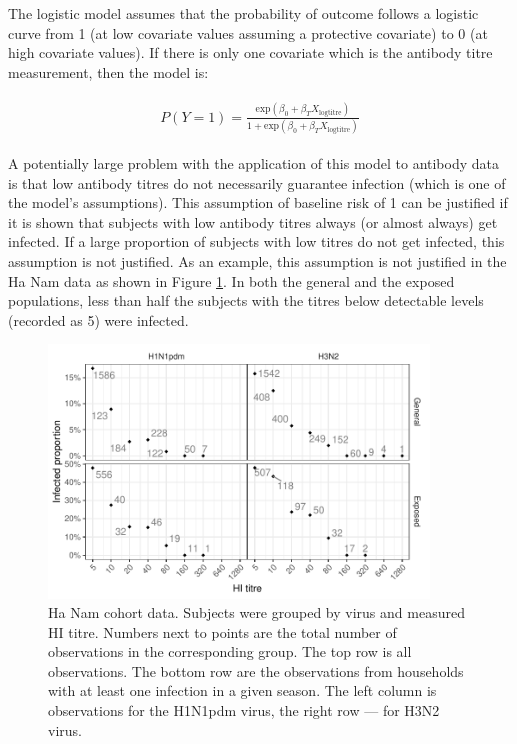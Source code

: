 \documentclass[12pt]{article}
\begin{document}
The logistic model assumes that the probability of outcome follows a logistic curve from 1 (at low covariate values assuming a protective covariate) to 0 (at high covariate values). If there is only one covariate which is the antibody titre measurement, then the model is:

\begin{align*}
\begin{gathered}
P(Y=1) = \frac{\text{exp}(\beta_0 + \beta_T X_{\text{logtitre}})}{1 + \text{exp}(\beta_0 + \beta_T X_{\text{logtitre}})}
\end{gathered}
\end{align*}

A potentially large problem with the application of this model to antibody data is that low antibody titres do not necessarily guarantee infection (which is one of the model's assumptions). This assumption of baseline risk of 1 can be justified if it is shown that subjects with low antibody titres always (or almost always) get infected. If a large proportion of subjects with low titres do not get infected, this assumption is not justified. As an example, this assumption is not justified in the Ha Nam data as shown in Figure \ref{HanamCounts}. In both the general and the exposed populations, less than half the subjects with the titres below detectable levels (recorded as 5) were infected.

\begin{figure}[htp]
	\centering
	\includegraphics[width=0.9\textwidth]{../data-plot/hanam-hi-summ-light.pdf}
	\caption{
	Ha Nam cohort data. Subjects were grouped by virus and measured HI titre. Numbers next to points are the total number of observations in the corresponding group. The top row is all observations. The bottom row are the observations from households with at least one infection in a given season. The left column is observations for the H1N1pdm virus, the right row --- for H3N2 virus.
	}
	\label{HanamCounts}
\end{figure}
\end{document}
